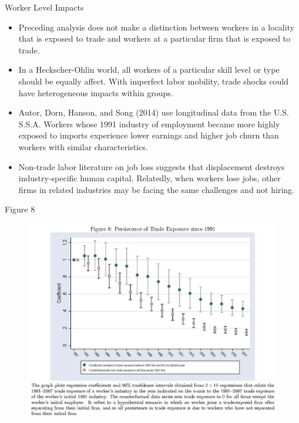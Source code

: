 \documentclass[aspectratio=169]{beamer}
\begin{document}
\begin{frame}{Worker Level Impacts}

\begin{itemize}
    \item<1-> Preceding analysis does not make a distinction between workers in a locality that is exposed to trade and workers at a particular firm that is exposed to trade.
    \item<2-> In a Heckscher-Ohlin world, all workers of a particular skill level or type should be equally affect.  With imperfect labor mobility, trade shocks could have heterogeneous impacts within groups.
    \item<3-> Autor, Dorn, Hanson, and Song (2014) use longitudinal data from the U.S. S.S.A.  Workers whose 1991 industry of employment became more highly exposed to imports experience lower earnings and higher job churn than workers with similar characteristics.
    \item<4-> Non-trade labor literature on job loss suggests that displacement destroys industry-specific human capital.  Relatedly, when workers lose jobs, other firms in related industries may be facing the same challenges and not hiring.
\end{itemize}
    
\end{frame}


\begin{frame}{Figure 8}

\begin{figure}
    \centering
    \includegraphics[scale=0.53]{AutorDornHansonFig8.jpg}
    \label{fig:Fig8}
\end{figure}
    
\end{frame}
\end{document}
